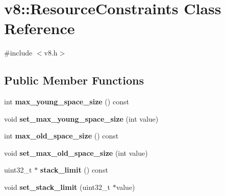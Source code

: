 \hypertarget{classv8_1_1_resource_constraints}{}\section{v8\+:\+:Resource\+Constraints Class Reference}
\label{classv8_1_1_resource_constraints}


{\ttfamily \#include $<$v8.\+h$>$}

\subsection*{Public Member Functions}
\begin{DoxyCompactItemize}
\item 
\hypertarget{classv8_1_1_resource_constraints_a0029d59f46980f02651792eac83bd432}{}int {\bfseries max\+\_\+young\+\_\+space\+\_\+size} () const \label{classv8_1_1_resource_constraints_a0029d59f46980f02651792eac83bd432}

\item 
\hypertarget{classv8_1_1_resource_constraints_abe82f0ef2376266257d3a94b9d4af265}{}void {\bfseries set\+\_\+max\+\_\+young\+\_\+space\+\_\+size} (int value)\label{classv8_1_1_resource_constraints_abe82f0ef2376266257d3a94b9d4af265}

\item 
\hypertarget{classv8_1_1_resource_constraints_a72840efdbcfc7bb287c6aea38d0b07b9}{}int {\bfseries max\+\_\+old\+\_\+space\+\_\+size} () const \label{classv8_1_1_resource_constraints_a72840efdbcfc7bb287c6aea38d0b07b9}

\item 
\hypertarget{classv8_1_1_resource_constraints_aa764be7c76b4baa3fce7a54c3777b5e9}{}void {\bfseries set\+\_\+max\+\_\+old\+\_\+space\+\_\+size} (int value)\label{classv8_1_1_resource_constraints_aa764be7c76b4baa3fce7a54c3777b5e9}

\item 
\hypertarget{classv8_1_1_resource_constraints_aafc4a94f2eeb0684e7a50f355eb4d06d}{}uint32\+\_\+t $\ast$ {\bfseries stack\+\_\+limit} () const \label{classv8_1_1_resource_constraints_aafc4a94f2eeb0684e7a50f355eb4d06d}

\item 
\hypertarget{classv8_1_1_resource_constraints_a26ed3e89985a4afe34e84509fb093cf1}{}void {\bfseries set\+\_\+stack\+\_\+limit} (uint32\+\_\+t $\ast$value)\label{classv8_1_1_resource_constraints_a26ed3e89985a4afe34e84509fb093cf1}

\end{DoxyCompactItemize}


